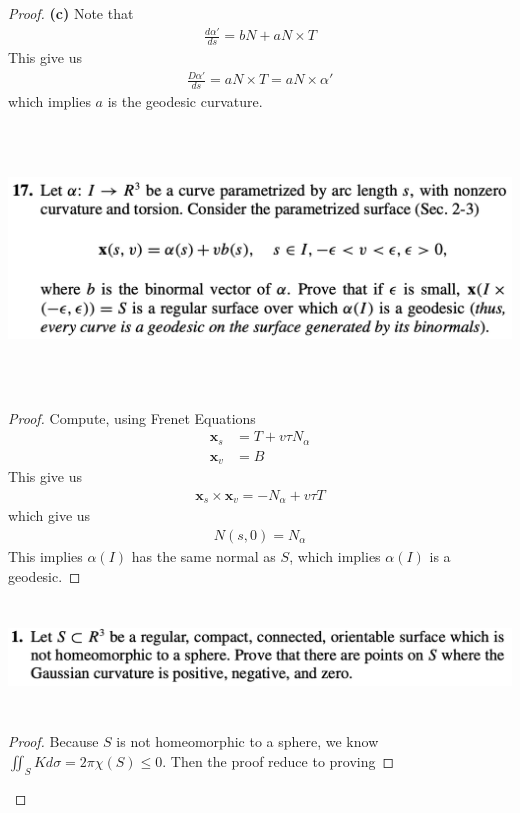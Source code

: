\documentclass{report}
\begin{document}
\begin{proof}
\textbf{(c)} Note that 
\begin{align*}
\frac{d\alpha '}{ds}=bN+ aN\times T
\end{align*}
This give us 
\begin{align*}
\frac{D\alpha '}{ds}=aN\times T=aN\times \alpha '
\end{align*}
which implies $a$ is the geodesic curvature. 
\begin{question}{}{}
\includegraphics[height=7cm,width=18cm]{hw999}
\end{question}
\begin{proof}
Compute, using Frenet Equations
\begin{align*}
\textbf{x}_s&= T + v \tau N_{\alpha }\\
\textbf{x}_v&= B
\end{align*}
This give us 
\begin{align*}
\textbf{x}_s \times \textbf{x}_v= -N_{\alpha }+v \tau T
\end{align*}
which give us 
\begin{align*}
N(s,0)=N_{\alpha }
\end{align*}
This implies $\alpha (I)$ has the same normal as $S$, which implies  $\alpha (I)$ is a geodesic.
\end{proof}
\begin{question}{}{}
\includegraphics[height=3cm,width=18cm]{hw7a}
\end{question}
\begin{proof}
Because $S$ is not homeomorphic to a sphere, we know $\iint_S K d\sigma = 2\pi \chi(S)\leq 0$. Then the proof reduce to proving 

\end{proof}
\end{proof}
\end{document}
